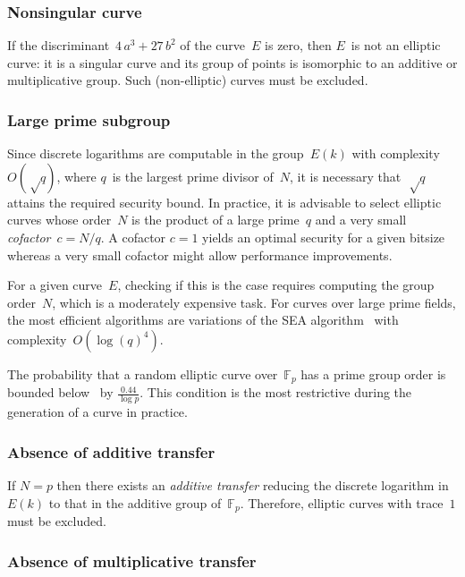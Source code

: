 \documentclass[twocolumn,letterpaper,10pt]{article}
\def\F{\mathbb{F}}
\begin{document}
\subsubsection{Nonsingular curve}
\label{sss:singular}

If the discriminant~$4\, a^3 + 27\,b^2$
of the curve~$E$ is zero, then $E$~is not an elliptic curve:
it is a singular curve and its group of points is isomorphic to
an additive or multiplicative group.
Such (non-elliptic) curves must be excluded.

\subsubsection{Large prime subgroup}
\label{sss:prime}

Since discrete logarithms are computable in the group~$E(k)$
with complexity~$O(√q)$, where $q$~is the largest prime divisor of~$N$,
it is necessary that~$√q$ attains the required security bound.
In practice, it is advisable to select elliptic curves whose order~$N$
is the product of a large prime~$q$
and a very small \emph{cofactor}~$c = N/q$.
A cofactor $c = 1$ yields an optimal security for a given bitsize
whereas a very small cofactor might allow performance improvements.

For a given curve~$E$, checking if this is the case
requires computing the group order~$N$,
which is a moderately expensive task.
For curves over large prime fields,
the most efficient algorithms are variations
of the SEA algorithm~\cite{mc1985schoof,
jtnb1995schoof,smf2008cl} with complexity~$O(\log(q)^4)$.

The probability that a random elliptic curve over~$\F_p$
has a prime group order is bounded below~\cite{lms2000gm}
by $\frac{0.44}{\log p}$.
This condition is the most restrictive during the generation
of a curve in practice.

\subsubsection{Absence of additive transfer}
\label{sss:anomalous}

If $N = p$ then there exists an \emph{additive transfer}
reducing the discrete logarithm in~$E(k)$
to that in the additive group of~$\F_p$.
Therefore, elliptic curves with trace~$1$ must be excluded.

\subsubsection{Absence of multiplicative transfer}
\label{sss:embedding-degree}
\end{document}
